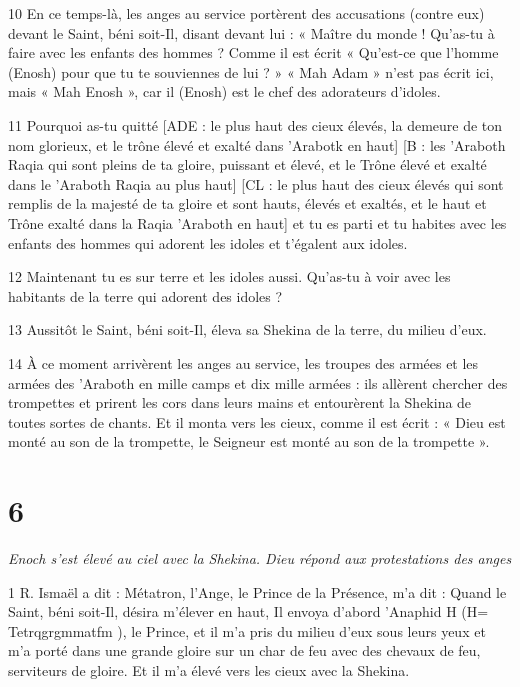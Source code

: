 \par 10 En ce temps-là, les anges au service portèrent des accusations (contre eux) devant le Saint, béni soit-Il, disant devant lui : « Maître du monde ! Qu'as-tu à faire avec les enfants des hommes ? Comme il est écrit « Qu'est-ce que l'homme (Enosh) pour que tu te souviennes de lui ? » « Mah Adam » n'est pas écrit ici, mais « Mah Enosh », car il (Enosh) est le chef des adorateurs d'idoles.

\par 11 Pourquoi as-tu quitté [ADE : le plus haut des cieux élevés, la demeure de ton nom glorieux, et le trône élevé et exalté dans 'Arabotk en haut] [B : les 'Araboth Raqia qui sont pleins de ta gloire, puissant et élevé, et le Trône élevé et exalté dans le 'Araboth Raqia au plus haut] [CL : le plus haut des cieux élevés qui sont remplis de la majesté de ta gloire et sont hauts, élevés et exaltés, et le haut et Trône exalté dans la Raqia 'Araboth en haut] et tu es parti et tu habites avec les enfants des hommes qui adorent les idoles et t'égalent aux idoles.

\par 12 Maintenant tu es sur terre et les idoles aussi. Qu’as-tu à voir avec les habitants de la terre qui adorent des idoles ?

\par 13 Aussitôt le Saint, béni soit-Il, éleva sa Shekina de la terre, du milieu d'eux.

\par 14 À ce moment arrivèrent les anges au service, les troupes des armées et les armées des 'Araboth en mille camps et dix mille armées : ils allèrent chercher des trompettes et prirent les cors dans leurs mains et entourèrent la Shekina de toutes sortes de chants. Et il monta vers les cieux, comme il est écrit : « Dieu est monté au son de la trompette, le Seigneur est monté au son de la trompette ».

\chapter{6}

\par \textit{Enoch s'est élevé au ciel avec la Shekina. Dieu répond aux protestations des anges}

\par 1 R. Ismaël a dit : Métatron, l'Ange, le Prince de la Présence, m'a dit : Quand le Saint, béni soit-Il, désira m'élever en haut, Il envoya d'abord 'Anaphid H (H= Tetrqgrgmmatfm ), le Prince, et il m'a pris du milieu d'eux sous leurs yeux et m'a porté dans une grande gloire sur un char de feu avec des chevaux de feu, serviteurs de gloire. Et il m'a élevé vers les cieux avec la Shekina.

